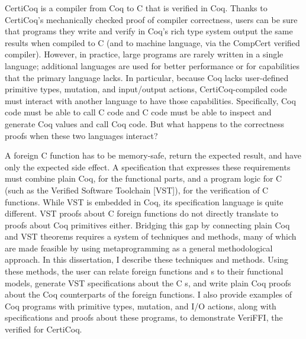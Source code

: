 
CertiCoq is a compiler from Coq to C that is verified in Coq. Thanks to CertiCoq's mechanically checked proof of compiler correctness, users can be sure that programs they write and verify in Coq's rich type system output the same results when compiled to C (and to machine language, via the CompCert verified compiler). However, in practice, large programs are rarely written in a single language; additional languages are used for better performance or for capabilities that the primary language lacks. In particular, because Coq lacks user-defined \gls{primitive} types, mutation, and input/output actions, CertiCoq-compiled code must interact with another language to have those capabilities. Specifically, Coq code must be able to call C code and C code must be able to inspect and generate Coq values and call Coq code. But what happens to the correctness proofs when these two languages interact?

A foreign C function has to be memory-safe, return the expected result, and have only the expected side effect. A specification that expresses these requirements must combine plain Coq, for the functional parts, and a program logic for C (such as the Verified Software Toolchain [VST]), for the verification of C functions. While VST is embedded in Coq, its specification language is quite different.
VST proofs about C \gls{foreign function}s do not directly translate to proofs about Coq \gls{primitive}s either.
Bridging this gap by connecting plain Coq and VST theorems requires a system of techniques and methods, many of which are made feasible by using \gls{metaprogramming} as a general methodological approach. In this dissertation, I describe these techniques and methods.
Using these methods, the user can relate \gls{foreign function}s and s to their \gls{functional model}s, generate VST specifications about the  C s, and write plain Coq proofs about the Coq counterparts of the \gls{foreign function}s.
I also provide examples of Coq programs with \gls{primitive} types, mutation, and I/O actions, along with specifications and proofs about these programs, to demonstrate VeriFFI, the verified \ffi{} for CertiCoq.



